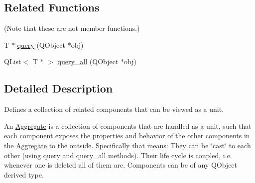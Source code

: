 \subsection*{\-Related \-Functions}
(\-Note that these are not member functions.) \begin{DoxyCompactItemize}
\item 
\-T $\ast$ \hyperlink{class_aggregation_1_1_aggregate_aa1790a8adba80f3a75ddb6e1a73c5246}{query} (\-Q\-Object $\ast$obj)
\item 
\-Q\-List$<$ \-T $\ast$ $>$ \hyperlink{class_aggregation_1_1_aggregate_a0528ea547017028ab58e315f88b58aa1}{query\-\_\-all} (\-Q\-Object $\ast$obj)
\end{DoxyCompactItemize}


\subsection{\-Detailed \-Description}
\-Defines a collection of related components that can be viewed as a unit. 

\-An \hyperlink{class_aggregation_1_1_aggregate}{\-Aggregate} is a collection of components that are handled as a unit, such that each component exposes the properties and behavior of the other components in the \hyperlink{class_aggregation_1_1_aggregate}{\-Aggregate} to the outside. \-Specifically that means\-:   \-They can be \char`\"{}cast\char`\"{} to each other (using query and query\-\_\-all methods).  \-Their life cycle is coupled, i.\-e. whenever one is deleted all of them are.  \-Components can be of any \-Q\-Object derived type.

